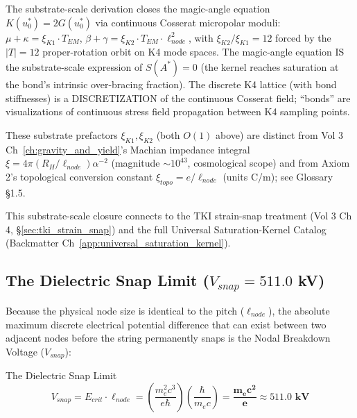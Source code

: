 The substrate-scale derivation closes the magic-angle equation
$K(u_0^*) = 2 G(u_0^*)$ via continuous Cosserat micropolar moduli:
$\mu + \kappa = \xi_{K1} \cdot T_{EM}$, $\beta + \gamma = \xi_{K2} \cdot T_{EM} \cdot \ell_{node}^2$,
with $\xi_{K2} / \xi_{K1} = 12$ forced by the $|T| = 12$ proper-rotation orbit
on K4 mode spaces. The magic-angle equation IS the substrate-scale expression
of $S(A^*) = 0$ (the kernel reaches saturation at the bond's intrinsic
over-bracing fraction). The discrete K4 lattice (with bond stiffnesses) is
a DISCRETIZATION of the continuous Cosserat field; ``bonds'' are
visualizations of continuous stress field propagation between K4
sampling points.

These substrate prefactors $\xi_{K1}, \xi_{K2}$ (both $O(1)$ above) are
distinct from Vol 3 Ch~\ref{ch:gravity_and_yield}'s Machian impedance integral
$\xi = 4\pi(R_H/\ell_{node})\alpha^{-2}$ (magnitude $\sim 10^{43}$,
cosmological scope) and from Axiom 2's topological conversion constant
$\xi_{topo} = e/\ell_{node}$ (units C/m); see Glossary \S1.5.

This substrate-scale closure connects to the TKI strain-snap treatment
(Vol 3 Ch 4, \S\ref{sec:tki_strain_snap}) and the full Universal
Saturation-Kernel Catalog (Backmatter Ch~\ref{app:universal_saturation_kernel}).

\subsection{The Dielectric Snap Limit ($V_{snap} = 511.0$ kV)}
Because the physical node size is identical to the pitch ($\ell_{node}$), the absolute maximum discrete electrical potential difference that can exist between two adjacent nodes before the string permanently snaps is the Nodal Breakdown Voltage ($V_{snap}$):
\begin{resultbox}{The Dielectric Snap Limit}
\begin{equation}
    V_{snap} = E_{crit} \cdot \ell_{node} = \left( \frac{m_e^2 c^3}{e \hbar} \right) \left( \frac{\hbar}{m_e c} \right) = \mathbf{\frac{m_e c^2}{e}} \approx \mathbf{511.0 \text{ kV}}
\end{equation}
\end{resultbox}

